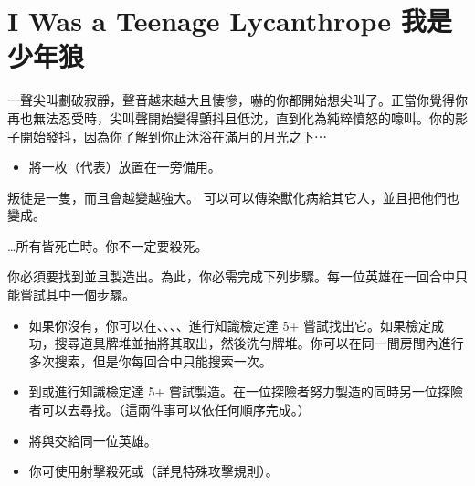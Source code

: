 
\chapter{I Was a Teenage Lycanthrope 我是少年狼}

\begin{HauntStory}
  一聲尖叫劃破寂靜，聲音越來越大且悽慘，嚇的你都開始想尖叫了。正當你覺得你再也無法忍受時，尖叫聲開始變得顫抖且低沈，直到化為純粹憤怒的嚎叫。你的影子開始發抖，因為你了解到你正沐浴在滿月的月光之下⋯
\end{HauntStory}

\vspace*{-1em}
\begin{itemize}
  \item 將一枚（代表）放置在一旁備用。
\end{itemize}


叛徒是一隻，而且會越變越強大。
可以可以傳染獸化病給其它人，並且把他們也變成。

…所有皆死亡時。你不一定要殺死。

你必須要找到並且製造出。為此，你必需完成下列步驟。每一位英雄在一回合中只能嘗試其中一個步驟。
\begin{itemize}
  \item 如果你沒有，你可以在、、、、進行知識檢定達 5+ 嘗試找出它。如果檢定成功，搜尋道具牌堆並抽將其取出，然後洗勻牌堆。你可以在同一間房間內進行多次搜索，但是你每回合中只能搜索一次。
  \item 到或進行知識檢定達 5+ 嘗試製造。在一位探險者努力製造的同時另一位探險者可以去尋找。（這兩件事可以依任何順序完成。）
  \item 將與交給同一位英雄。
  \item 你可使用射擊殺死或（詳見特殊攻擊規則）。
\end{itemize}

\vfill\null\pagebreak

